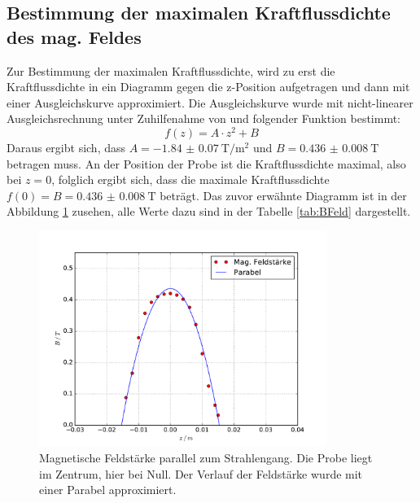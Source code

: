 \subsection{Bestimmung der maximalen Kraftflussdichte des mag. Feldes}
\label{sec:BFeld}
Zur Bestimmung der maximalen Kraftflussdichte, wird zu erst die Kraftflussdichte in ein
Diagramm gegen die z-Position aufgetragen und dann mit einer Ausgleichskurve approximiert.
Die Ausgleichskurve wurde mit nicht-linearer Ausgleichsrechnung unter Zuhilfenahme von
\cite{scipy} und folgender Funktion bestimmt:
\begin{equation*}
	f(z)= A \cdot z^2 + B
\end{equation*}
Daraus ergibt sich, dass $A= \SI{-1.84(7)}{\tesla\per\square\meter}$ und 
$B = \SI{0.436(8)}{\tesla}$
betragen muss. An der Position der Probe ist die Kraftflussdichte maximal, also bei
$z =0$, folglich ergibt sich, dass  die maximale Kraftflussdichte $f(0) =B= \SI{0.436(8)}{\tesla}$
beträgt. Das zuvor erwähnte Diagramm ist in der Abbildung \ref{fig:BFeld} zusehen, alle Werte
dazu sind in der Tabelle \ref{tab:BFeld} dargestellt.
 \begin{figure}
   \centering
   \includegraphics[height= 7cm]{plots/BFeld.pdf}
   \caption{Magnetische Feldstärke parallel zum Strahlengang. Die Probe liegt im Zentrum, hier bei Null. Der Verlauf der Feldstärke wurde mit einer Parabel approximiert.}
   \label{fig:BFeld}
 \end{figure}

